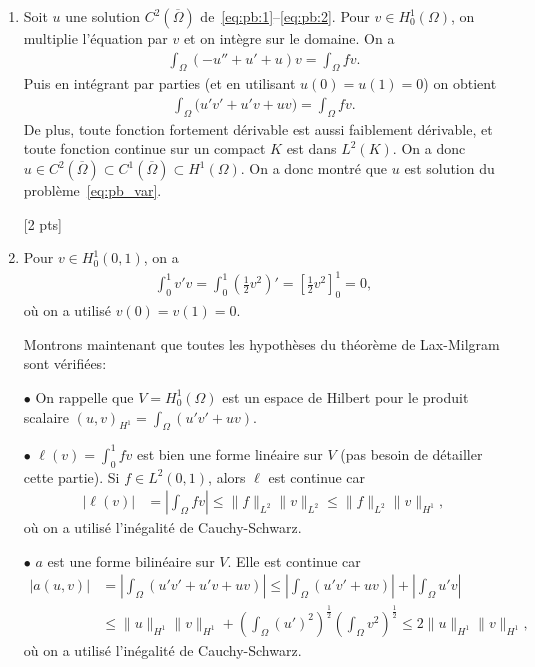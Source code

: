 \documentclass[12pt]{article}
\begin{document}

\begin{cor} $\quad$
  \\
  \begin{enumerate}
  \item Soit $u$ une solution $C^2(\overline{\Omega})$ de~\eqref{eq:pb:1}--\eqref{eq:pb:2}.
    Pour $v \in H^1_0(\Omega)$, on multiplie l'\'equation par $v$ et on int\`egre sur le domaine.
    On a
    \begin{align*}
      \int_{\Omega} (-u'' + u' + u) v = \int_{\Omega} f v .
    \end{align*}
    Puis en int\'egrant par parties (et en utilisant $u(0) = u(1) = 0$) on obtient
    \begin{align*}
      \int_{\Omega} \Big( u' v' + u' v + u v \Big) = \int_{\Omega} f v .
    \end{align*}
    De plus, toute fonction fortement d\'erivable est aussi faiblement d\'erivable,
    et toute fonction continue sur un compact $K$ est dans $L^2(K)$.
    On a donc $u \in C^2(\overline{\Omega}) \subset C^1(\overline{\Omega}) \subset H^1(\Omega)$.
    On a donc montr\'e que $u$ est solution du probl\`eme~\eqref{eq:pb_var}.
    
    [2 pts]
  \item
    Pour $v \in H^1_0(0,1)$, on a
    \begin{align*}
      \int_0^1 v' v = \int_0^1 \left(\frac12 v^2 \right)' = \left[\frac12 v^2 \right]_0^1 = 0 ,
    \end{align*}
    o\`u on a utilis\'e $v(0) = v(1) = 0$.


    Montrons maintenant que toutes les hypoth\`eses du th\'eor\`eme de Lax-Milgram sont v\'erifi\'ees:

    $\bullet$ On rappelle que $V = H_0^1(\Omega)$ est un espace de Hilbert
    pour le produit scalaire $(u,v)_{H^1} = \int_{\Omega} (u'v' + u v)$.

    $\bullet$ $\ell(v) = \int_0^1 fv$ est bien une forme lin\'eaire sur $V$
    (pas besoin de d\'etailler cette partie).
    Si $f \in L^2(0,1)$, alors $\ell$ est continue car
    \begin{align*}
      | \ell(v) |
      &= \left| \int_{\Omega} f v \right| \leq \| f \|_{L^2} \| v \|_{L^2}
        \leq \| f \|_{L^2} \| v \|_{H^1} ,
    \end{align*}
    o\`u on a utilis\'e l'in\'egalit\'e de Cauchy-Schwarz.


    $\bullet$ $a$ est une forme bilin\'eaire sur $V$.
    Elle est continue car
    \begin{align*}
      | a(u,v) |
      &= \left| \int_{\Omega} (u'v' + u'v + u v) \right|
        \leq \left| \int_{\Omega} (u'v' + u v) \right|
        + \left| \int_{\Omega} u'v \right|
      \\
      &\leq \| u \|_{H^1} \| v \|_{H^1}
        + \left(\int_{\Omega} (u')^2 \right)^{\frac12} \left(\int_{\Omega} v^2 \right)^{\frac12}
      \leq 2 \| u \|_{H^1} \| v \|_{H^1} ,
    \end{align*}
    o\`u on a utilis\'e l'in\'egalit\'e de Cauchy-Schwarz.


\end{enumerate}
\end{cor}
\end{document}
